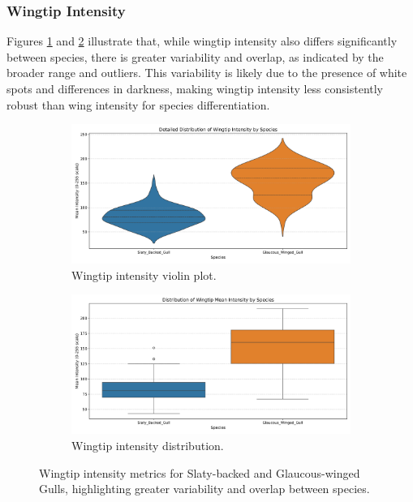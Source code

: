 \documentclass[a4paper,12pt]{report}
\begin{document}
\subsubsection{Wingtip Intensity}
Figures \ref{fig:wingtip_intensity_violin} and \ref{fig:wingtip_intensity_distribution} illustrate that, while wingtip intensity also differs significantly between species, there is greater variability and overlap, as indicated by the broader range and outliers. This variability is likely due to the presence of white spots and differences in darkness, making wingtip intensity less consistently robust than wing intensity for species differentiation.

\begin{figure}[H]
    \centering
    \begin{subfigure}[b]{0.44\textwidth}
        \centering
        \includegraphics[width=\textwidth]{images/REPORT_IMAGES_INTENSITY/I2/wingtip_intensity_violin_plot.png}
        \caption{Wingtip intensity violin plot.}
        \label{fig:wingtip_intensity_violin}
    \end{subfigure}
    \hfill
    \begin{subfigure}[b]{0.44\textwidth}
        \centering
        \includegraphics[width=\textwidth]{images/REPORT_IMAGES_INTENSITY/I2/wingtip_intensity_distribution.png}
        \caption{Wingtip intensity distribution.}
        \label{fig:wingtip_intensity_distribution}
    \end{subfigure}
    \caption{Wingtip intensity metrics for Slaty-backed and Glaucous-winged Gulls, highlighting greater variability and overlap between species.}
    \label{fig:wingtip_intensity_combined}
\end{figure}
\end{document}
